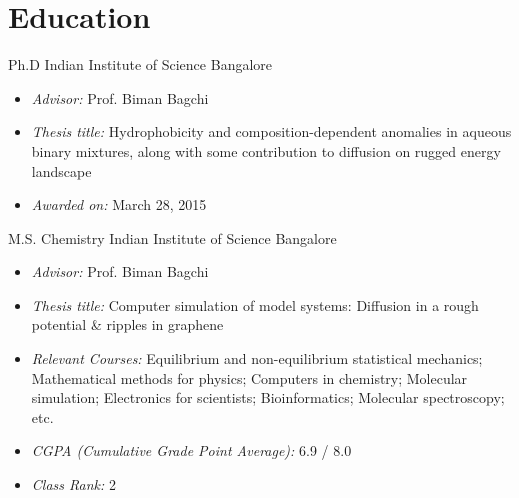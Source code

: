 \section{Education}
        {Ph.D}
        {Indian Institute of Science}
        {Bangalore}
        {}
        {\vspace{-1.0em}%
         \begin{itemize}%
         \setlength{\itemsep}{0.35em}
              \item {\itshape\color{color2} Advisor:} Prof. Biman Bagchi
              \item {\itshape\color{color2} Thesis title:} %
                    Hydrophobicity and composition-dependent anomalies in aqueous binary mixtures,
                    along with some contribution to diffusion on rugged energy landscape
              \item {\itshape\color{color2} Awarded on:} March 28, 2015
         \end{itemize}
        }

        {M.S. Chemistry}
        {Indian Institute of Science}
        {Bangalore}
        {}
        {\vspace{-1.0em}%
         \begin{itemize}%
         \setlength{\itemsep}{0.35em}
              \item {\itshape\color{color2} Advisor:} Prof. Biman Bagchi
              \item {\itshape\color{color2} Thesis title:} %
                    Computer simulation of model systems: Diffusion in a rough potential \& ripples in graphene
              \item {\itshape\color{color2} Relevant Courses:} %
                                      Equilibrium and non-equilibrium statistical mechanics;
                                      Mathematical methods for physics;
                                      Computers in chemistry;
                                      Molecular simulation;
                                      Electronics for scientists;
                                      Bioinformatics;
                                      Molecular spectroscopy;
                                      etc.
              \item {\itshape\color{color2} CGPA (Cumulative Grade Point Average):} 6.9 / 8.0
              \item {\itshape\color{color2} Class Rank:} 2
         \end{itemize}
        }

